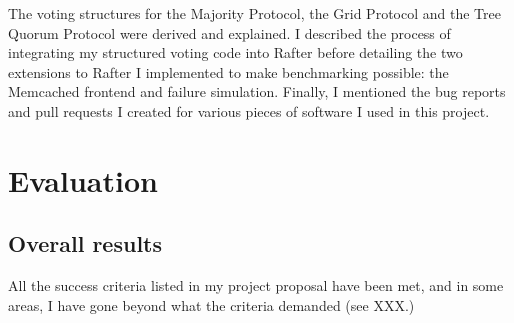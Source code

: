\documentclass[12pt,chapterprefix=true,toc=bibliography,numbers=noendperiod,
               footnotes=multiple,twoside]{scrreprt}
\begin{document}
The voting structures for the Majority Protocol, the Grid Protocol and the Tree Quorum Protocol were derived and explained. I described the process of integrating my structured voting code into Rafter before detailing the two extensions to Rafter I implemented to make benchmarking possible: the Memcached frontend and failure simulation. Finally, I mentioned the bug reports and pull requests I created for various pieces of software I used in this project.



\chapter{Evaluation}
\label{ch:evaluation}



\section{Overall results}
\label{sc:overall-results}

All the success criteria listed in my project proposal have been met, and in some areas, I have gone beyond what the criteria demanded (see XXX.)
\end{document}
